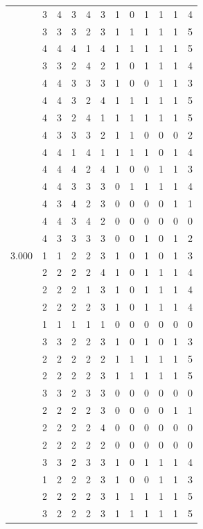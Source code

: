 \documentclass[]{msu-thesis}
\theoremstyle{definition}
\theoremstyle{definition}
\theoremstyle{definition}
\theoremstyle{remark}
\begin{document}
\begin{table}
{\begin{tabular}[t]{rrrrrrrrrrrr}
 & 3 & 4 & 3 & 4 & 3 & 1 & 0 & 1 & 1 & 1 & 4\\
 & 3 & 3 & 3 & 2 & 3 & 1 & 1 & 1 & 1 & 1 & 5\\
 & 4 & 4 & 4 & 1 & 4 & 1 & 1 & 1 & 1 & 1 & 5\\
 & 3 & 3 & 2 & 4 & 2 & 1 & 0 & 1 & 1 & 1 & 4\\
 & 4 & 4 & 3 & 3 & 3 & 1 & 0 & 0 & 1 & 1 & 3\\
 & 4 & 4 & 3 & 2 & 4 & 1 & 1 & 1 & 1 & 1 & 5\\
 & 4 & 3 & 2 & 4 & 1 & 1 & 1 & 1 & 1 & 1 & 5\\
 & 4 & 3 & 3 & 3 & 2 & 1 & 1 & 0 & 0 & 0 & 2\\
 & 4 & 4 & 1 & 4 & 1 & 1 & 1 & 1 & 0 & 1 & 4\\
 & 4 & 4 & 4 & 2 & 4 & 1 & 0 & 0 & 1 & 1 & 3\\
 & 4 & 4 & 3 & 3 & 3 & 0 & 1 & 1 & 1 & 1 & 4\\
 & 4 & 3 & 4 & 2 & 3 & 0 & 0 & 0 & 0 & 1 & 1\\
 & 4 & 4 & 3 & 4 & 2 & 0 & 0 & 0 & 0 & 0 & 0\\
 & 4 & 3 & 3 & 3 & 3 & 0 & 0 & 1 & 0 & 1 & 2\\
3.000 & 1 & 1 & 2 & 2 & 3 & 1 & 0 & 1 & 0 & 1 & 3\\
 & 2 & 2 & 2 & 2 & 4 & 1 & 0 & 1 & 1 & 1 & 4\\
 & 2 & 2 & 2 & 1 & 3 & 1 & 0 & 1 & 1 & 1 & 4\\
 & 2 & 2 & 2 & 2 & 3 & 1 & 0 & 1 & 1 & 1 & 4\\
 & 1 & 1 & 1 & 1 & 1 & 0 & 0 & 0 & 0 & 0 & 0\\
 & 3 & 3 & 2 & 2 & 3 & 1 & 0 & 1 & 0 & 1 & 3\\
 & 2 & 2 & 2 & 2 & 2 & 1 & 1 & 1 & 1 & 1 & 5\\
 & 2 & 2 & 2 & 2 & 3 & 1 & 1 & 1 & 1 & 1 & 5\\
 & 3 & 3 & 2 & 3 & 3 & 0 & 0 & 0 & 0 & 0 & 0\\
 & 2 & 2 & 2 & 2 & 3 & 0 & 0 & 0 & 0 & 1 & 1\\
 & 2 & 2 & 2 & 2 & 4 & 0 & 0 & 0 & 0 & 0 & 0\\
 & 2 & 2 & 2 & 2 & 2 & 0 & 0 & 0 & 0 & 0 & 0\\
 & 3 & 3 & 2 & 3 & 3 & 1 & 0 & 1 & 1 & 1 & 4\\
 & 1 & 2 & 2 & 2 & 3 & 1 & 0 & 0 & 1 & 1 & 3\\
 & 2 & 2 & 2 & 2 & 3 & 1 & 1 & 1 & 1 & 1 & 5\\
 & 3 & 2 & 2 & 2 & 3 & 1 & 1 & 1 & 1 & 1 & 5\\

\end{tabular}}
\end{table}
\end{document}
